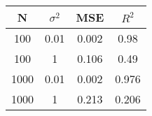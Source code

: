 \begin{tabular}{cccc}
\hline \hline
    N & $\sigma^2$ &    MSE &  $R^2$ \\
\hline \hline
  100 &       0.01 &  0.002 &   0.98 \\
  100 &          1 &  0.106 &   0.49 \\
 1000 &       0.01 &  0.002 &  0.976 \\
 1000 &          1 &  0.213 &  0.206 \\
\hline \hline
\end{tabular}
